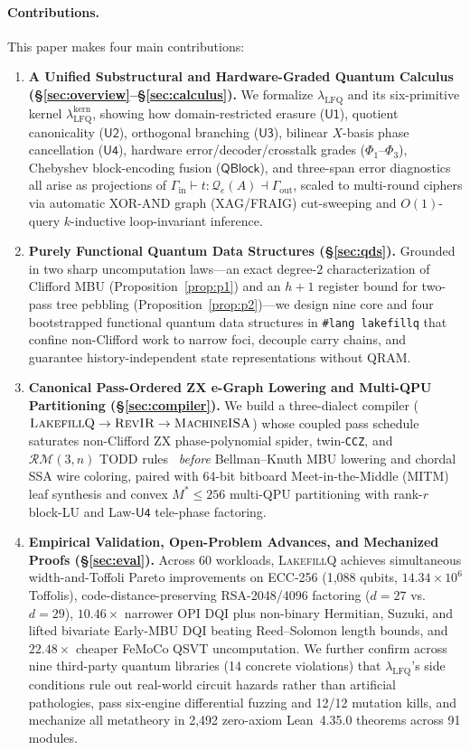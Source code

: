 \documentclass[acmsmall,screen,anonymous]{acmart}
\DeclareRobustCommand{\_}{\ifmmode\text{\char95}\else\char95\penalty0\relax\fi}
\theoremstyle{plain}
\newcommand{\LakefillQ}{\textsc{LakefillQ}}
\newcommand{\RevIR}{\textsc{RevIR}}
\newcommand{\MachineISA}{\textsc{MachineISA}}
\newcommand{\QBlock}{\ensuremath{\mathsf{QBlock}}}
\begin{document}
\paragraph{Contributions.}
This paper makes four main contributions:
\begin{enumerate}
  \item \textbf{A Unified Substructural and Hardware-Graded Quantum Calculus (\S\ref{sec:overview}--\S\ref{sec:calculus}).} We formalize $\lambda_{\mathrm{LFQ}}$ and its six-primitive kernel $\lambda_{\mathrm{LFQ}}^{\mathrm{kern}}$, showing how domain-restricted erasure ($\mathsf{U1}$), quotient canonicality ($\mathsf{U2}$), orthogonal branching ($\mathsf{U3}$), bilinear $X$-basis phase cancellation ($\mathsf{U4}$), hardware error/decoder/crosstalk grades ($\Phi_1$--$\Phi_3$), Chebyshev block-encoding fusion ($\QBlock$), and three-span error diagnostics all arise as projections of $\Gamma_{\mathrm{in}} \vdash t : \mathcal{Q}_{e}(A) \dashv \Gamma_{\mathrm{out}}$, scaled to multi-round ciphers via automatic XOR-AND graph (XAG/FRAIG) cut-sweeping and $O(1)$-query $k$-inductive loop-invariant inference.
  \item \textbf{Purely Functional Quantum Data Structures (\S\ref{sec:qds}).} Grounded in two sharp uncomputation laws---an exact degree-$2$ characterization of Clifford MBU (Proposition~\ref{prop:p1}) and an $h+1$ register bound for two-pass tree pebbling (Proposition~\ref{prop:p2})---we design nine core and four bootstrapped functional quantum data structures in \texttt{\#lang lakefillq} that confine non-Clifford work to narrow foci, decouple carry chains, and guarantee history-independent state representations without QRAM.
  \item \textbf{Canonical Pass-Ordered ZX e-Graph Lowering and Multi-QPU Partitioning (\S\ref{sec:compiler}).} We build a three-dialect compiler ($\LakefillQ{} \to \RevIR{} \to \MachineISA{}$) whose coupled pass schedule saturates non-Clifford ZX phase-polynomial spider, twin-\texttt{CCZ}, and $\mathcal{RM}(3,n)$ TODD rules~\cite{kissinger2020tcount} \emph{before} Bellman--Knuth MBU lowering and chordal SSA wire coloring, paired with 64-bit bitboard Meet-in-the-Middle (MITM) leaf synthesis and convex $M^* \le 256$ multi-QPU partitioning with rank-$r$ block-LU and Law-$\mathsf{U4}$ tele-phase factoring.
  \item \textbf{Empirical Validation, Open-Problem Advances, and Mechanized Proofs (\S\ref{sec:eval}).} Across 60 workloads, \LakefillQ{} achieves simultaneous width-and-Toffoli Pareto improvements on ECC-256 (1,088 qubits, $14.34\times 10^6$ Toffolis), code-distance-preserving RSA-2048/4096 factoring ($d=27$ vs.\ $d=29$), $10.46\times$ narrower OPI DQI plus non-binary Hermitian, Suzuki, and lifted bivariate Early-MBU DQI beating Reed--Solomon length bounds, and $22.48\times$ cheaper FeMoCo QSVT uncomputation. We further confirm across nine third-party quantum libraries (14 concrete violations) that $\lambda_{\mathrm{LFQ}}$'s side conditions rule out real-world circuit hazards rather than artificial pathologies, pass six-engine differential fuzzing and 12/12 mutation kills, and mechanize all metatheory in 2,492 zero-axiom Lean~4.35.0 theorems across 91 modules.
\end{enumerate}
\end{document}
